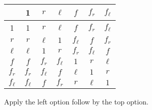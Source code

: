 \documentclass[12pt]{report}
\begin{document}
\begin{figure*}
   \centering
   \begin{tabular}{c|cccccc}
     & 1 & $r$ & $\ell$ & $f$ & $f_r$ & $f_\ell$ \\
     \hline
     1        & 1        & $r$    & $\ell$    & $f$ & $f_r$ & $f_\ell$ \\
     $r$      & $r$      & $\ell$ & $1$       & $f_\ell$ & $f$   & $f_r$      \\
     $\ell$   & $\ell$   & $1$    & $r$       & $f_r$ & $f_\ell$   & $f$      \\
     $f$      & $f$      & $f_r$  & $f_\ell$   & $1$ & $r$   & $\ell$      \\
     $f_r$    & $f_r$     & $f_\ell$   & $f$    & $\ell$ & $1$   & $r$      \\
     $f_\ell$  & $f_\ell$   & $f$   & $f_r$      & $r$ & $\ell$   & $1$      \\
   \end{tabular}
   \caption{Apply the left option follow by the top option.}
\end{figure*}
\end{document}
